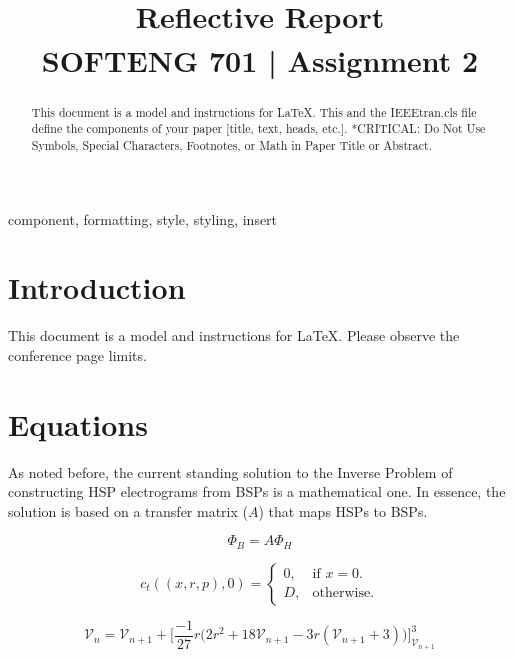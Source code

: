 \documentclass[10pt,a4paper,conference]{IEEEtran}
\newcommand{\Vc}{\mathcal{V}}
\begin{document}
\title{Reflective Report\\
{\footnotesize \textsuperscript{}SOFTENG 701 | Assignment 2}}

\author{

}

\maketitle

\begin{abstract}
This document is a model and instructions for \LaTeX.
This and the IEEEtran.cls file define the components of your paper [title, text, heads, etc.]. *CRITICAL: Do Not Use Symbols, Special Characters, Footnotes,
or Math in Paper Title or Abstract.
\end{abstract}

\begin{IEEEkeywords}
component, formatting, style, styling, insert
\end{IEEEkeywords}

\section{Introduction}
This document is a model and instructions for \LaTeX.
Please observe the conference page limits.

\section{Equations}
As noted before, the current standing solution to the Inverse Problem of constructing HSP electrograms from BSPs is a mathematical one. In essence, the solution is based on a transfer matrix ($A$) that maps HSPs to BSPs.

\begin{equation*}
  \Phi_B = A \Phi_H
\end{equation*}


\begin{equation}
  c_{t}((x,r,p),0)=\begin{cases}
    0, & \text{if $x=0$}.\\
    D, & \text{otherwise}.
  \end{cases}
\end{equation}

\begin{equation}
	\Vc_n = \Vc_{n+1}  +  \bigg[  \frac{-1}{27} r \big( 2r^2 + 18\Vc_{n+1} - 3r(\Vc_{n+1}+3)\big)    \bigg]_{\Vc_{n+1}}^{3}
	\end{equation}
\end{document}
